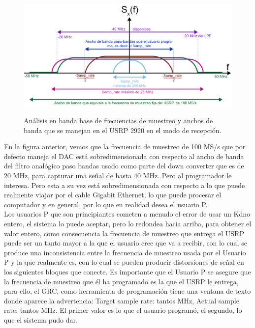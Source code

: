 \vspace{250px}
\begin{figure}[h!]
	\captionsetup{justification = raggedright, singlelinecheck = false}
	\caption{Análisis en banda base de frecuencias de muestreo y anchos de banda que se manejan en el USRP 2920 en el modo de recepción.} 
	\centering
	\includegraphics[scale=0.3]{Imagenes/Analisis-banda.png}
	\label{fig:Analisis-banda}
\end{figure}

En la figura anterior, vemos que la frecuencia de muestreo de 100 MS/s que por defecto maneja el DAC está sobredimensionada con respecto al ancho de banda del filtro analógico paso bandas usado como parte del down converter que es de 20 MHz, para capturar una señal de hasta 40 MHz. Pero al programador le interesa. Pero esta a su vez está sobredimensionada con respecto a lo que puede realmente viajar por el cable Gigabit Ethernet, lo que puede procesar el computador y en general, por lo que en realidad desea el usuario P. \\

Los usuarios P que son principiantes cometen a menudo el error de usar un Kdno entero, el sistema lo puede aceptar, pero lo redondea hacia arriba, para obtener el valor entero, como consecuencia la frecuencia de muestreo que entrega el USRP puede ser un tanto mayor a la que el usuario cree que va a recibir, con lo cual se produce una inconsistencia entre la frecuencia de muestreo usada por el Usuario P y la que realmente es, con lo cual se pueden producir distorsiones de señal en los siguientes bloques que conecte. Es importante que el Usuario P se asegure que la frecuencia de muestreo que él ha programado es la que el USRP le entrega, para ello, el GRC, como herramienta de programación tiene una ventana de texto donde aparece la advertencia: Target sample rate: tantos MHz, Actual sample rate: tantos MHz. El primer valor es lo que el usuario programó, el segundo, lo que el sistema pudo dar. \\

